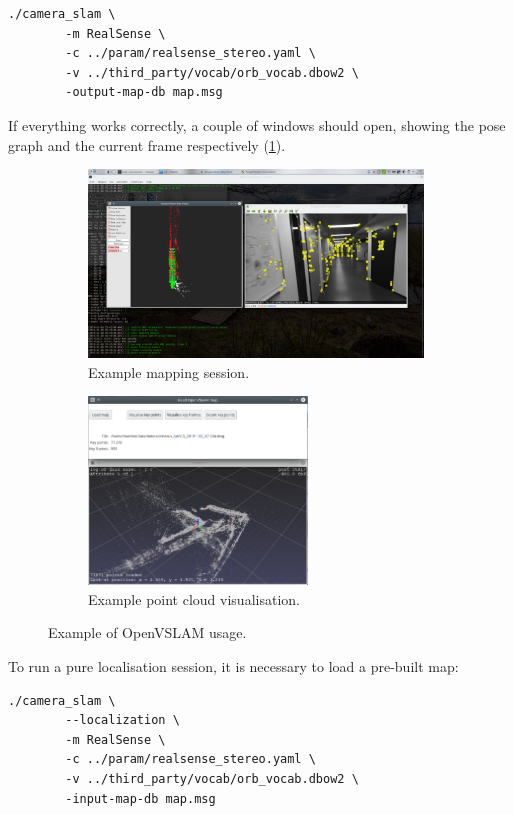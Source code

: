 \documentclass[11pt, letterpaper, twoside]{article}
\begin{document}
\begin{Verbatim}[samepage=true]
    ./camera_slam \
        -m RealSense \
        -c ../param/realsense_stereo.yaml \
        -v ../third_party/vocab/orb_vocab.dbow2 \
        -output-map-db map.msg
\end{Verbatim}

If everything works correctly, a couple of windows should open, showing the
pose graph and the current frame respectively (\cref{fig:openvslam_mapping}).

\begin{figure}[tb]
    \centering
    \begin{subfigure}[t]{.59\textwidth}
        \centering
        \includegraphics[height=5cm]{openvslam.png}
        \caption{Example mapping session.}\label{fig:openvslam_mapping}
    \end{subfigure}
    \begin{subfigure}[t]{.39\textwidth}
        \centering
        \includegraphics[height=5cm]{load_map.png}
        \caption{Example point cloud visualisation.}\label{fig:openvslam_load_map}
    \end{subfigure}
    \caption{Example of OpenVSLAM usage.}\label{fig:openvslam}
\end{figure}

To run a pure localisation session, it is necessary to load a pre-built map:

\begin{Verbatim}[samepage=true]
    ./camera_slam \
        --localization \
        -m RealSense \
        -c ../param/realsense_stereo.yaml \
        -v ../third_party/vocab/orb_vocab.dbow2 \
        -input-map-db map.msg
\end{Verbatim}
\end{document}
